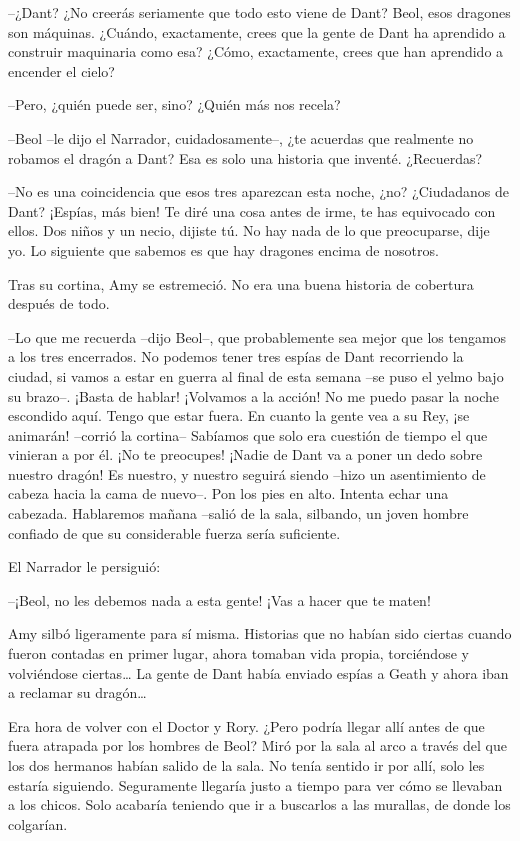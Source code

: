 {--¿Dant? ¿No creerás seriamente que todo esto viene de Dant? Beol,
	esos dragones son máquinas. ¿Cuándo, exactamente, crees que la gente de
	Dant ha aprendido a construir maquinaria como esa? ¿Cómo, exactamente,
crees que han aprendido a encender el cielo?}

{--Pero, ¿quién puede ser, sino? ¿Quién más nos recela?}

{--Beol --le dijo el Narrador, cuidadosamente--, ¿te acuerdas que
	realmente no robamos el dragón a Dant? Esa es solo una historia que
inventé. ¿Recuerdas?}

{--No es una coincidencia que esos tres aparezcan esta noche, ¿no?
	¿Ciudadanos de Dant? ¡Espías, más bien! Te diré una cosa antes de irme,
	te has equivocado con ellos. Dos niños y un necio, dijiste tú. No hay
	nada de lo que preocuparse, dije yo. Lo siguiente que sabemos es que hay
dragones encima de nosotros.}

{Tras su cortina, Amy se estremeció. No era una buena historia de
cobertura después de todo.}

{--Lo que me recuerda --dijo Beol--, que probablemente sea mejor que
	los tengamos a los tres encerrados. No podemos tener tres espías de Dant
	recorriendo la ciudad, si vamos a estar en guerra al final de esta
	semana --se puso el yelmo bajo su brazo--. ¡Basta de hablar! ¡Volvamos a
	la acción! No me puedo pasar la noche escondido aquí. Tengo que estar
	fuera. En cuanto la gente vea a su Rey, ¡se animarán! --corrió la
	cortina-- Sabíamos que solo era cuestión de tiempo el que vinieran a por
	él. ¡No te preocupes! ¡Nadie de Dant va a poner un dedo sobre nuestro
	dragón! Es nuestro, y nuestro seguirá siendo --hizo un asentimiento de
	cabeza hacia la cama de nuevo--. Pon los pies en alto. Intenta echar una
	cabezada. Hablaremos mañana --salió de la sala, silbando, un joven
hombre confiado de que su considerable fuerza sería suficiente.}

{El Narrador le persiguió:}

{--¡Beol, no les debemos nada a esta gente! ¡Vas a hacer que te
maten!}

{Amy silbó ligeramente para sí misma. Historias que no habían sido
	ciertas cuando fueron contadas en primer lugar, ahora tomaban vida
	propia, torciéndose y volviéndose ciertas\ldots{} La gente de Dant había
	enviado espías a Geath y ahora iban a reclamar su dragón\ldots{}}

{Era hora de volver con el Doctor y Rory. ¿Pero podría llegar allí antes
	de que fuera atrapada por los hombres de Beol? Miró por la sala al arco
	a través del que los dos hermanos habían salido de la sala. No tenía
	sentido ir por allí, solo les estaría siguiendo. Seguramente llegaría
	justo a tiempo para ver cómo se llevaban a los chicos. Solo acabaría
teniendo que ir a buscarlos a las murallas, de donde los colgarían.}

